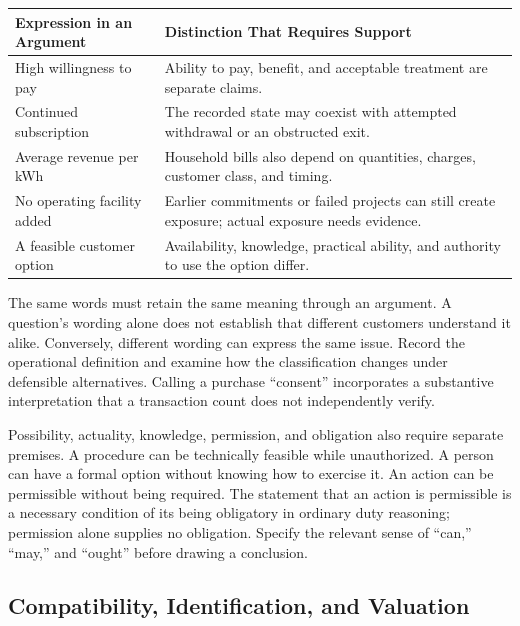 \begin{table}[H]
\centering\small
\begin{tabular}{@{}
  >{\raggedright\arraybackslash}p{}
  >{\raggedright\arraybackslash}p{}@{}}
\toprule
Expression in an Argument & Distinction That Requires Support \\
\midrule

High willingness to pay & Ability to pay, benefit, and acceptable
treatment are separate claims. \\
Continued subscription & The recorded state may coexist with attempted
withdrawal or an obstructed exit. \\
Average revenue per kWh & Household bills also depend on quantities,
charges, customer class, and timing. \\
No operating facility added & Earlier commitments or failed projects can
still create exposure; actual exposure needs evidence. \\
A feasible customer option & Availability, knowledge, practical ability,
and authority to use the option differ. \\
\bottomrule
\end{tabular}
\end{table}

The same words must retain the same meaning through an argument. A
question's wording alone does not establish that different customers
understand it alike. Conversely, different wording can express the same
issue. Record the operational definition and examine how the
classification changes under defensible alternatives. Calling a purchase
``consent'' incorporates a substantive interpretation that a transaction
count does not independently verify.

Possibility, actuality, knowledge, permission, and obligation also
require separate premises. A procedure can be technically feasible while
unauthorized. A person can have a formal option without knowing how to
exercise it. An action can be permissible without being required. The
statement that an action is permissible is a necessary condition of its
being obligatory in ordinary duty reasoning; permission alone supplies
no obligation. Specify the relevant sense of ``can,'' ``may,'' and
``ought'' before drawing a conclusion.

\hypertarget{M09-compatibility-identification-and-valuation}{%
\subsection{Compatibility, Identification, and
Valuation}\label{M09-compatibility-identification-and-valuation}}

